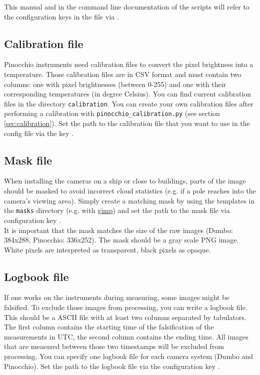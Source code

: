 \documentclass[11pt,a4paper]{article}
\begin{document}
This manual and in the command line documentation of the scripts will refer to the configuration keys in the file via .

\subsection{Calibration file}
Pinocchio instruments need calibration files to convert the pixel brightness into a temperature. Those calibration files are in CSV format and must contain two columns: one with pixel brightnesses (between 0-255) and one with their corresponding temperatures (in degree Celsius). You can find current calibration files in the directory \texttt{calibration}. You can create your own calibration files after performing a calibration with \texttt{pinocchio\_calibration.py} (see section \ref{sec:calibration}). Set the path to the calibration file that you want to use in the config file via the key .

\subsection{Mask file}
When installing the cameras on a ship or close to buildings, parts of the image should be masked to avoid incorrect cloud statistics (e.g. if a pole reaches into the camera's viewing area). Simply create a matching mask by using the templates in the \texttt{masks} directory (e.g. with \href{https://www.gimp.org}{gimp}) and set the path to the mask file via configuration key .\\
It is important that the mask matches the size of the raw images (Dumbo: 384x288, Pinocchio: 336x252). The mask should be a gray scale PNG image. White pixels are interpreted as transparent, black pixels as opaque.

\subsection{Logbook file}
If one works on the instruments during measuring, some images might be falsified. To exclude those images from processing, you can write a logbook file. This should be a ASCII file with at least two columns separated by tabulators. The first column contains the starting time of the falsification of the measurements in UTC, the second column contains the ending time. All images that are measured between those two timestamps will be excluded from processing. You can specify one logbook file for each camera system (Dumbo and Pinocchio). Set the path to the logbook file via the configuration key .\\
\end{document}
